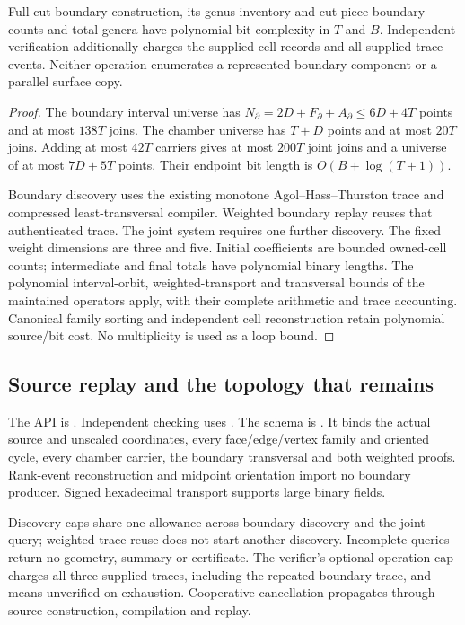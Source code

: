 \begin{proposition}
Full cut-boundary construction, its genus inventory and cut-piece boundary
counts and total genera have polynomial bit complexity in $T$ and $B$.
Independent verification additionally charges the supplied cell records
and all supplied trace events. Neither operation enumerates a represented
boundary component or a parallel surface copy.
\end{proposition}
\begin{proof}
The boundary interval universe has
$N_\partial=2D+F_\partial+A_\partial\le6D+4T$ points and at most $138T$
joins. The chamber universe has $T+D$ points and at most $20T$ joins.
Adding at most $42T$ carriers gives at most $200T$ joint joins and a universe
of at most $7D+5T$ points. Their endpoint bit length is
$O(B+\log(T+1))$.

Boundary discovery uses the existing monotone Agol--Hass--Thurston trace
and compressed least-transversal compiler. Weighted boundary replay reuses
that authenticated trace. The joint system requires one further discovery.
The fixed weight dimensions are three and five. Initial coefficients are
bounded owned-cell counts; intermediate and final totals have polynomial
binary lengths. The polynomial interval-orbit, weighted-transport and
transversal bounds of the maintained operators apply, with their complete
arithmetic and trace accounting\cite{aht-orbits}. Canonical family sorting
and independent cell reconstruction retain polynomial source/bit cost.
No multiplicity is used as a loop bound.
\end{proof}

\subsection{Source replay and the topology that remains}

The API is . Independent checking uses
. The schema is
. It binds the actual source and unscaled
coordinates, every face/edge/vertex family and oriented cycle, every chamber
carrier, the boundary transversal and both weighted proofs. Rank-event
reconstruction and midpoint orientation import no boundary producer.
Signed hexadecimal transport supports large binary fields.

Discovery caps share one allowance across boundary discovery and the joint
query; weighted trace reuse does not start another discovery. Incomplete
queries return no geometry, summary or certificate. The verifier's optional
operation cap charges all three supplied traces, including the repeated
boundary trace, and means unverified on exhaustion. Cooperative cancellation
propagates through source construction, compilation and replay.


